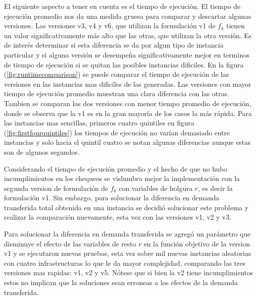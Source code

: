 \documentclass{article}
\begin{document}
  El siguiente aspecto a tener en cuenta es el tiempo de ejecución. El tiempo de ejecución promedio nos da una medida gruesa para comparar y descartar algunas versiones. Las versiones v3, v4 y v6, que utilizan la formulación v1 de $f_k$ tienen un valor significativamente más alto que las otras, que utilizan la otra versión. Es de interés determinar si esta diferencia se da por algun tipo de instancia particular y si alguna versión se desempeña significativamente mejor en terminos de tiempo de ejecución si se quitan las posibles instancias dificiles. En la figura (\ref{fig:runtimecomparison}) se puede comparar el tiempo de ejecución de las versiones en las instancias mas dificiles de las generadas. Las versiones con mayor tiempo de ejecución promedio muestran una clara diferencia con las otras. Tambien se comparan las dos versiones con menor tiempo promedio de ejecución, donde se observa que la v1 es en la gran mayoría de los casos la más rápida. Para las instancias mas sencillas, primeros cuatro quintiles en figura (\ref{fig:firstfourquintiles}) los tiempos de ejecución no varían demasiado entre instancias y solo hacia el quintil cuatro se notan algunas diferencias aunque estas son de algunos segundos.

  Considerando el tiempo de ejecución promedio y el hecho de que no hubo incumplimientos en los chequeos se vislumbra mejor la implementación con la segunda version de formulación de $f_k$ con variables de holgura $r$, es decir la formulación v1. Sin embargo, para solucionar la diferencia en demanda transferida total obtenida en una instancia se decidió solucionar este problema y realizar la comparación nuevamente, esta vez con las versiones v1, v2 y v3.

  Para solucionar la diferencia en demanda transferida se agregó un parámetro que disminuye el efecto de las variables de resto $r$ en la función objetivo de la version v1 y se ejecutaron nuevas pruebas, esta vez sobre mil nuevas instancias aleatorias con cuatro infrastructuras lo que le da mayor complejidad, comparando las tres versiones mas rapidas: v1, v2 y v5. Nótese que si bien la v2 tiene incumplimientos estos no implican que la soluciones sean erroneas a los efectos de la demanda transferida.

\end{document}
